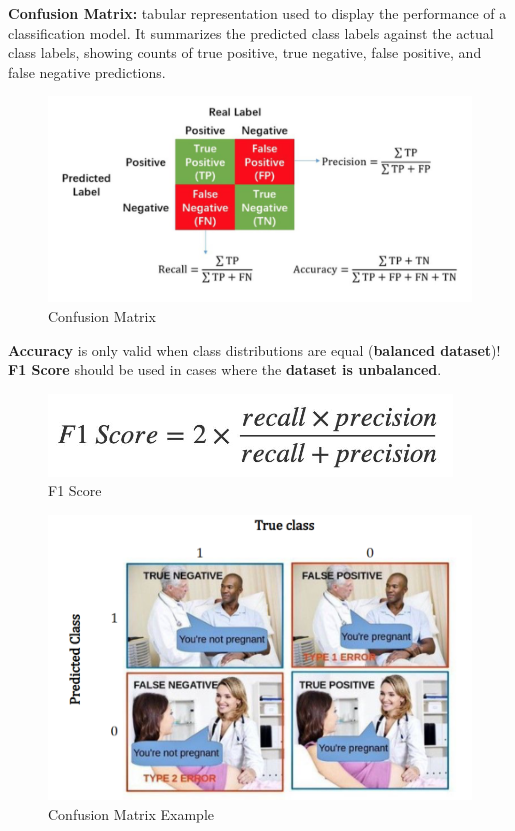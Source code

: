 \begin{definition}
    \textbf{Confusion Matrix:} tabular representation used to display the performance of a classification model. It summarizes the predicted class labels against the actual class labels, showing counts of true positive, true negative, false positive, and false negative predictions.
\end{definition}

\begin{figure}[h]
    \centering
    \includegraphics[width=0.7\linewidth]{confusionmatrix.png}
    \caption{Confusion Matrix}
    \label{fig:enter-label}
\end{figure}

\begin{warning}
    \textbf{Accuracy} is only valid when class distributions are equal (\textbf{balanced dataset})! \textbf{F1 Score} should be used in cases where the \textbf{dataset is unbalanced}.
\end{warning}

\begin{figure}[h!t]
    \centering
    \includegraphics[width=0.45\linewidth]{f1.png}
    \caption{F1 Score}
    \label{fig:enter-label}
\end{figure}

\begin{figure}[h!t]
    \centering
    \includegraphics[width=0.5\linewidth]{ConfusionMatrixEx.png}
    \caption{Confusion Matrix Example}
    \label{fig:enter-label}
\end{figure}


